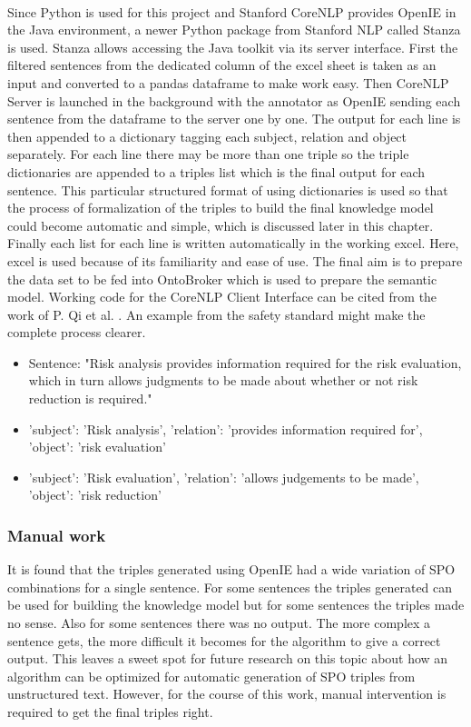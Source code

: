 \paragraph{} Since Python is used for this project and Stanford CoreNLP provides OpenIE in the Java environment, a newer Python package from Stanford NLP called Stanza is used. Stanza allows accessing the Java toolkit via its server interface. First the filtered sentences from the dedicated column of the excel sheet is taken as an input and converted to a pandas dataframe to make work easy. Then CoreNLP Server is launched in the background with the annotator as OpenIE sending each sentence from the dataframe to the server one by one. The output for each line is then appended to a dictionary tagging each subject, relation and object separately. For each line there may be more than one triple so the triple dictionaries are appended to a triples list which is the final output for each sentence. This particular structured format of using dictionaries is used so that the process of formalization of the triples to build the final knowledge model could become automatic and simple, which is discussed later in this chapter. Finally each list for each line is written automatically in the working excel. Here, excel is used because of its familiarity and ease of use. The final aim is to prepare the data set to be fed into OntoBroker which is used to prepare the semantic model. Working code for the CoreNLP Client Interface can be cited from the work of P. Qi et al. \cite{stanza}. An example from the safety standard might make the complete process clearer. 
\begin{itemize}
\item Sentence: "Risk analysis provides information required for the risk evaluation, which in turn allows judgments to be made about whether or not risk reduction is required."
\item 'subject': 'Risk analysis', 'relation': 'provides information required for', 'object': 'risk evaluation'
\item 'subject': 'Risk evaluation', 'relation': 'allows judgements to be made', 'object': 'risk reduction'
\end{itemize}

\subsubsection{Manual work}
It is found that the triples generated using OpenIE had a wide variation of SPO combinations for a single sentence. For some sentences the triples generated can be used for building the knowledge model but for some sentences the triples made no sense. Also for some sentences there was no output. The more complex a sentence gets, the more difficult it becomes for the algorithm to give a correct output. This leaves a sweet spot for future research on this topic about how an algorithm can be optimized for automatic generation of SPO triples from unstructured text. However, for the course of this work, manual intervention is required to get the final triples right.

